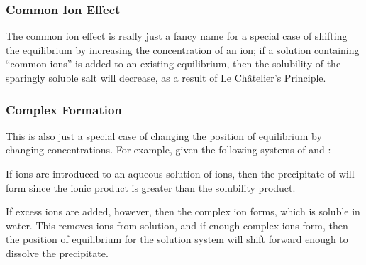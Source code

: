 			\subsubsection{Common Ion Effect}

				The common ion effect is really just a fancy name for a special case of shifting the equilibrium by increasing the concentration of an ion;
				if a solution containing \enquote{common ions} is added to an existing equilibrium, then the solubility of the sparingly soluble salt
				will decrease, as a result of Le Châtelier's Principle.


			\subsubsection{Complex Formation}

				This is also just a special case of changing the position of equilibrium by changing concentrations.
				For example, given the following systems of  and \ch{[\Al(OH)4]-}:


				If  ions are introduced to an aqueous solution of  ions, then the precipitate of  will form since
				the ionic product is greater than the solubility product.

				If excess  ions are added, however, then the complex ion \ch{[\Al(OH)4]-} forms, which is soluble in water. This
				removes  ions from solution, and if enough complex ions form, then the position of equilibrium for the solution system
				will shift forward enough to dissolve the precipitate.

















